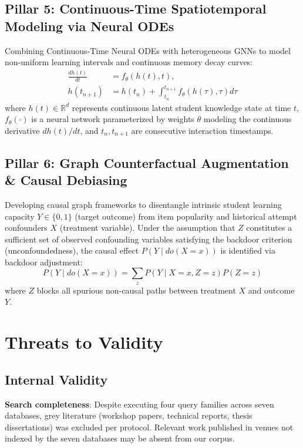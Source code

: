 \documentclass[journal]{IEEEtran}
\begin{document}
\subsection{Pillar 5: Continuous-Time Spatiotemporal Modeling via Neural ODEs}
Combining Continuous-Time Neural ODEs with heterogeneous GNNs to model non-uniform learning intervals and continuous memory decay curves:
\begin{equation}
\begin{split}
\frac{dh(t)}{dt} &= f_\theta(h(t), t), \\
h(t_{n+1}) &= h(t_n) + \int_{t_n}^{t_{n+1}} f_\theta(h(\tau), \tau) d\tau
\end{split}
\end{equation}
where $h(t) \in \mathbb{R}^d$ represents continuous latent student knowledge state at time $t$, $f_\theta(\cdot)$ is a neural network parameterized by weights $\theta$ modeling the continuous derivative $dh(t)/dt$, and $t_n, t_{n+1}$ are consecutive interaction timestamps.

\subsection{Pillar 6: Graph Counterfactual Augmentation \& Causal Debiasing}
Developing causal graph frameworks to disentangle intrinsic student learning capacity $Y \in \{0, 1\}$ (target outcome) from item popularity and historical attempt confounders $X$ (treatment variable). Under the assumption that $Z$ constitutes a sufficient set of observed confounding variables satisfying the backdoor criterion (unconfoundedness), the causal effect $P(Y \mid do(X = x))$ is identified via backdoor adjustment:
\begin{equation}
P(Y \mid do(X = x)) = \sum_{z} P(Y \mid X = x, Z = z) P(Z = z)
\end{equation}
where $Z$ blocks all spurious non-causal paths between treatment $X$ and outcome $Y$.

\section{Threats to Validity}
\label{sec:validity}

\subsection{Internal Validity}
\textbf{Search completeness}: Despite executing four query families across seven databases, grey literature (workshop papers, technical reports, thesis dissertations) was excluded per protocol. Relevant work published in venues not indexed by the seven databases may be absent from our corpus.
\end{document}
